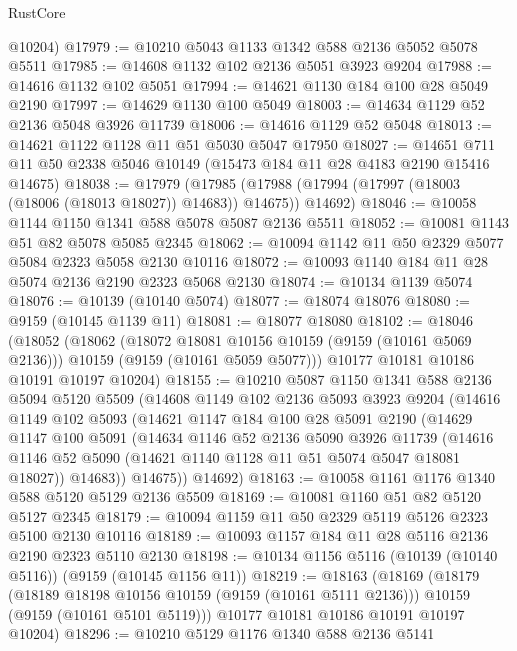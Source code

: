 \begin{lexlean}{RustCore}
\begin{coremodule}
      @10204)
@17979 := @10210 @5043 @1133 @1342 @588 @2136 @5052 @5078 @5511
@17985 := @14608 @1132 @102 @2136 @5051 @3923 @9204
@17988 := @14616 @1132 @102 @5051
@17994 := @14621 @1130 @184 @100 @28 @5049 @2190
@17997 := @14629 @1130 @100 @5049
@18003 := @14634 @1129 @52 @2136 @5048 @3926 @11739
@18006 := @14616 @1129 @52 @5048
@18013 := @14621 @1122 @1128 @11 @51 @5030 @5047 @17950
@18027 := @14651 @711 @11 @50 @2338 @5046 @10149 (@15473 @184 @11 @28 @4183 @2190 @15416 @14675)
@18038 := @17979
    (@17985 (@17988 (@17994 (@17997 (@18003 (@18006 (@18013 @18027)) @14683)) @14675)) @14692)
@18046 := @10058 @1144 @1150 @1341 @588 @5078 @5087 @2136 @5511
@18052 := @10081 @1143 @51 @82 @5078 @5085 @2345
@18062 := @10094 @1142 @11 @50 @2329 @5077 @5084 @2323 @5058 @2130 @10116
@18072 := @10093 @1140 @184 @11 @28 @5074 @2136 @2190 @2323 @5068 @2130
@18074 := @10134 @1139 @5074
@18076 := @10139 (@10140 @5074)
@18077 := @18074 @18076
@18080 := @9159 (@10145 @1139 @11)
@18081 := @18077 @18080
@18102 := @18046
    (@18052
      (@18062
        (@18072 @18081 @10156 @10159 (@9159 (@10161 @5069 @2136)))
        @10159
        (@9159 (@10161 @5059 @5077)))
      @10177
      @10181
      @10186
      @10191
      @10197
      @10204)
@18155 := @10210
    @5087
    @1150
    @1341
    @588
    @2136
    @5094
    @5120
    @5509
    (@14608
      @1149
      @102
      @2136
      @5093
      @3923
      @9204
      (@14616
        @1149
        @102
        @5093
        (@14621
          @1147
          @184
          @100
          @28
          @5091
          @2190
          (@14629
            @1147
            @100
            @5091
            (@14634
              @1146
              @52
              @2136
              @5090
              @3926
              @11739
              (@14616 @1146 @52 @5090 (@14621 @1140 @1128 @11 @51 @5074 @5047 @18081 @18027))
              @14683))
          @14675))
      @14692)
@18163 := @10058 @1161 @1176 @1340 @588 @5120 @5129 @2136 @5509
@18169 := @10081 @1160 @51 @82 @5120 @5127 @2345
@18179 := @10094 @1159 @11 @50 @2329 @5119 @5126 @2323 @5100 @2130 @10116
@18189 := @10093 @1157 @184 @11 @28 @5116 @2136 @2190 @2323 @5110 @2130
@18198 := @10134 @1156 @5116 (@10139 (@10140 @5116)) (@9159 (@10145 @1156 @11))
@18219 := @18163
    (@18169
      (@18179
        (@18189 @18198 @10156 @10159 (@9159 (@10161 @5111 @2136)))
        @10159
        (@9159 (@10161 @5101 @5119)))
      @10177
      @10181
      @10186
      @10191
      @10197
      @10204)
@18296 := @10210
    @5129
    @1176
    @1340
    @588
    @2136
    @5141

\end{coremodule}
\end{lexlean}
